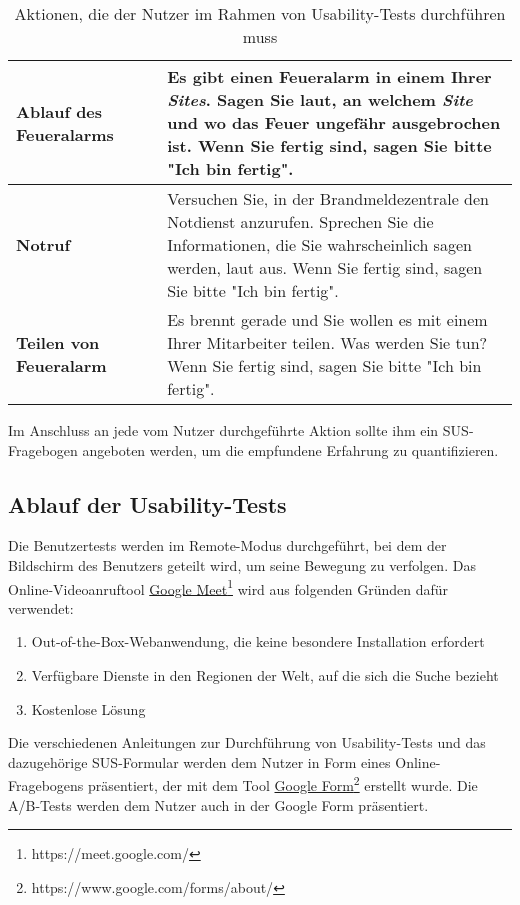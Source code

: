 \begin{table}[H]
\begin{tabular}{p{0.3\linewidth} |p{0.7\linewidth}}
    \textbf{Ablauf des Feueralarms}                   & Es gibt einen Feueralarm in einem Ihrer \textit{Sites}. Sagen Sie laut, an welchem \textit{Site} und wo das Feuer ungefähr ausgebrochen ist. Wenn Sie fertig sind, sagen Sie bitte "Ich bin fertig".                                                                                                              \\\hline
    \textbf{Notruf}                                   & Versuchen Sie, in der Brandmeldezentrale den Notdienst anzurufen. Sprechen Sie die Informationen, die Sie wahrscheinlich sagen werden, laut aus. Wenn Sie fertig sind, sagen Sie bitte "Ich bin fertig".                                                                                                          \\\hline
    \textbf{Teilen von Feueralarm}                    & Es brennt gerade und Sie wollen es mit einem Ihrer Mitarbeiter teilen. Was werden Sie tun? Wenn Sie fertig sind, sagen Sie bitte "Ich bin fertig".
  \end{tabular}
  \caption{Aktionen, die der Nutzer im Rahmen von Usability-Tests durchführen muss}
\end{table}

Im Anschluss an jede vom Nutzer durchgeführte Aktion sollte ihm ein \ac{SUS}-Fragebogen angeboten werden, um die empfundene Erfahrung zu quantifizieren.

\subsection{Ablauf der Usability-Tests}

Die Benutzertests werden im Remote-Modus durchgeführt, bei dem der Bildschirm des Benutzers geteilt wird, um seine Bewegung zu verfolgen.
Das Online-Videoanruftool \href{https://meet.google.com/}{Google Meet}\footnote{https://meet.google.com/} wird aus folgenden Gründen dafür verwendet:

\begin{enumerate}
  \item Out-of-the-Box-Webanwendung, die keine besondere Installation erfordert
  \item Verfügbare Dienste in den Regionen der Welt, auf die sich die Suche bezieht
  \item Kostenlose Lösung
\end{enumerate}

Die verschiedenen Anleitungen zur Durchführung von Usability-Tests und das dazugehörige \ac{SUS}-Formular werden dem Nutzer in Form eines Online-Fragebogens präsentiert, der mit dem Tool \href{https://www.google.com/forms/about/}{Google Form}\footnote{https://www.google.com/forms/about/}  erstellt wurde.
Die A/B-Tests werden dem Nutzer auch in der Google Form präsentiert.

